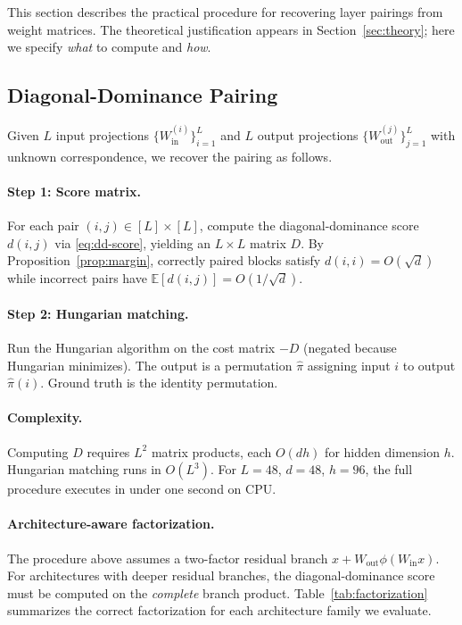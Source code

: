 \documentclass[wcp]{jmlr}
\begin{document}
This section describes the practical procedure for recovering layer pairings from weight matrices. The theoretical justification appears in Section~\ref{sec:theory}; here we specify \emph{what} to compute and \emph{how}.

\subsection{Diagonal-Dominance Pairing}\label{sec:pairing}

Given $L$ input projections $\{W_{\mathrm{in}}^{(i)}\}_{i=1}^L$ and $L$ output projections $\{W_{\mathrm{out}}^{(j)}\}_{j=1}^L$ with unknown correspondence, we recover the pairing as follows.

\paragraph{Step 1: Score matrix.} For each pair $(i,j) \in [L] \times [L]$, compute the diagonal-dominance score $d(i,j)$ via \eqref{eq:dd-score}, yielding an $L \times L$ matrix $D$. By Proposition~\ref{prop:margin}, correctly paired blocks satisfy $d(i,i) = O(\sqrt{d})$ while incorrect pairs have $\mathbb{E}[d(i,j)] = O(1/\sqrt{d})$.

\paragraph{Step 2: Hungarian matching.} Run the Hungarian algorithm on the cost matrix $-D$ (negated because Hungarian minimizes). The output is a permutation $\hat\pi$ assigning input $i$ to output $\hat\pi(i)$. Ground truth is the identity permutation.

\paragraph{Complexity.} Computing $D$ requires $L^2$ matrix products, each $O(dh)$ for hidden dimension $h$. Hungarian matching runs in $O(L^3)$. For $L{=}48$, $d{=}48$, $h{=}96$, the full procedure executes in under one second on CPU.

\paragraph{Architecture-aware factorization.} The procedure above assumes a two-factor residual branch $x + W_{\mathrm{out}} \phi(W_{\mathrm{in}} x)$. For architectures with deeper residual branches, the diagonal-dominance score must be computed on the \emph{complete} branch product. Table~\ref{tab:factorization} summarizes the correct factorization for each architecture family we evaluate.
\end{document}
